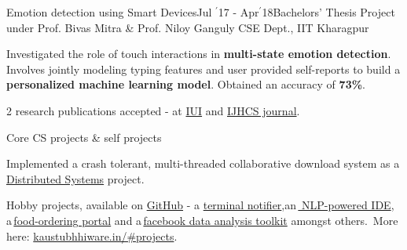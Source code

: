 \documentclass[11pt, a4paper]{resume}
\begin{document}
\begin{rSubsection}{Emotion detection using Smart Devices}{Jul $^{\prime}$17 - Apr$^{\prime}$18}{Bachelors' Thesis Project under Prof. Bivas Mitra \& Prof. Niloy Ganguly}{\hspace*{\fill} CSE Dept., IIT Kharagpur}
\item Investigated the role of touch interactions in {\bf multi-state emotion detection}. Involves jointly modeling typing features and  user provided self-reports to build a {\bf personalized machine learning model}. Obtained an accuracy of {\bf 73\%}.
\item 2 research publications accepted - at \href{https://iui.acm.org/2019/}{IUI}  and \href{https://www.journals.elsevier.com/international-journal-of-human-computer-studies}{IJHCS journal}. %
\end{rSubsection}



\begin{rSubsection}{Core CS projects \& self projects}{}{}{}
\item Implemented a crash tolerant, multi-threaded collaborative download system as a \href{https://github.com/kaustubhhiware/swift}{Distributed Systems} project.
\item Hobby projects, available on \href{https://github.com/kaustubhhiware}{GitHub} - a \href{https://github.com/kaustubhhiware/ NotiFyre}{terminal notifier},an\,\href{https://github.com/kaustubhhiware/c0derunR}{ NLP-powered IDE}, a\,\href{https://github.com/kaustubhhiware/Foodspark}{food-ordering portal} and a\,\href{https://github.com/kaustubhhiware/facebook-archive}{facebook data analysis toolkit} amongst others.\  More here: \href{https://kaustubhhiware.in/#projects}{kaustubhhiware.in/\#projects}.
\end{rSubsection}
\end{document}
